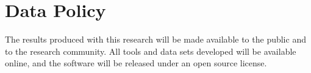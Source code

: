 \documentclass[11pt]{article}
\begin{document}



\section{Data Policy}

The results produced with this research will be made available to the
public and to the research community.  All tools and data sets
developed will be available online, and the software will be released
under an open source license.


\footnotesize


\end{document}
